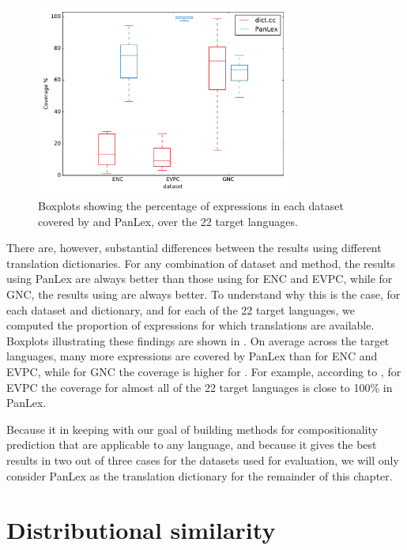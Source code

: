 \documentclass[output=paper
,modfonts
,nonflat]{langsci/langscibook}
\begin{document}
\begin{figure}[t]
\begin{center}
  \includegraphics[width=0.75\textwidth]{figures/coverage-boxplot.pdf}
\caption{Boxplots showing the percentage of expressions in each
  dataset covered by \dictcc and PanLex, over the 22 target
  languages.\label{fig:ccdict:coverage}}
\end{center}
\end{figure}

There are, however, substantial differences between the results using
different translation dictionaries. For any combination of dataset and
method, the results using PanLex are always better than those using
\dictcc for ENC and EVPC, while for GNC, the results using \dictcc are
always better. To understand why this is the case, for each dataset 
and dictionary, and for each of the 22 target languages, we computed the 
proportion of expressions for which translations are
available. Boxplots illustrating these findings are shown in
. On average across the target languages,
many more expressions are covered by PanLex than \dictcc for ENC and
EVPC, while for GNC the coverage is higher for \dictcc. For example,
according to , for EVPC the coverage for
almost all of the 22 target languages is close to 100\% in PanLex.

Because it in keeping with our goal of building methods for
compositionality prediction that are applicable to any language, and
because it gives the best results in two out of three cases for the
datasets used for evaluation, we will only consider PanLex as the
translation dictionary for the remainder of this chapter.


\section{Distributional similarity\label{sec:distsim}}
\end{document}
